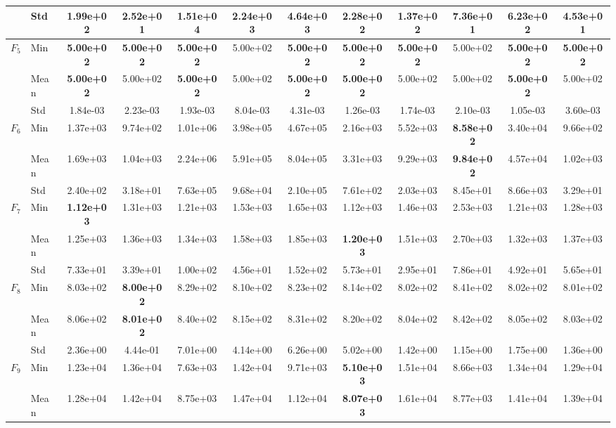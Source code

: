 \begin{center}
\begin{longtable}{clcccccccccc}
 & Std & 1.99e+02 & 2.52e+01 & 1.51e+04 & 2.24e+03 & 4.64e+03 & 2.28e+02 & 1.37e+02 & 7.36e+01 & 6.23e+02 & 4.53e+01 \\
\midrule
\multirow{3}{*}{$F_{5}$} & Min & \textbf{5.00e+02} & \textbf{5.00e+02} & \textbf{5.00e+02} & 5.00e+02 & \textbf{5.00e+02} & \textbf{5.00e+02} & \textbf{5.00e+02} & 5.00e+02 & \textbf{5.00e+02} & \textbf{5.00e+02} \\
 & Mean & \textbf{5.00e+02} & 5.00e+02 & \textbf{5.00e+02} & 5.00e+02 & \textbf{5.00e+02} & \textbf{5.00e+02} & 5.00e+02 & 5.00e+02 & \textbf{5.00e+02} & 5.00e+02 \\
 & Std & 1.84e-03 & 2.23e-03 & 1.93e-03 & 8.04e-03 & 4.31e-03 & 1.26e-03 & 1.74e-03 & 2.10e-03 & 1.05e-03 & 3.60e-03 \\
\midrule
\multirow{3}{*}{$F_{6}$} & Min & 1.37e+03 & 9.74e+02 & 1.01e+06 & 3.98e+05 & 4.67e+05 & 2.16e+03 & 5.52e+03 & \textbf{8.58e+02} & 3.40e+04 & 9.66e+02 \\
 & Mean & 1.69e+03 & 1.04e+03 & 2.24e+06 & 5.91e+05 & 8.04e+05 & 3.31e+03 & 9.29e+03 & \textbf{9.84e+02} & 4.57e+04 & 1.02e+03 \\
 & Std & 2.40e+02 & 3.18e+01 & 7.63e+05 & 9.68e+04 & 2.10e+05 & 7.61e+02 & 2.03e+03 & 8.45e+01 & 8.66e+03 & 3.29e+01 \\
\midrule
\multirow{3}{*}{$F_{7}$} & Min & \textbf{1.12e+03} & 1.31e+03 & 1.21e+03 & 1.53e+03 & 1.65e+03 & 1.12e+03 & 1.46e+03 & 2.53e+03 & 1.21e+03 & 1.28e+03 \\
 & Mean & 1.25e+03 & 1.36e+03 & 1.34e+03 & 1.58e+03 & 1.85e+03 & \textbf{1.20e+03} & 1.51e+03 & 2.70e+03 & 1.32e+03 & 1.37e+03 \\
 & Std & 7.33e+01 & 3.39e+01 & 1.00e+02 & 4.56e+01 & 1.52e+02 & 5.73e+01 & 2.95e+01 & 7.86e+01 & 4.92e+01 & 5.65e+01 \\
\midrule
\multirow{3}{*}{$F_{8}$} & Min & 8.03e+02 & \textbf{8.00e+02} & 8.29e+02 & 8.10e+02 & 8.23e+02 & 8.14e+02 & 8.02e+02 & 8.41e+02 & 8.02e+02 & 8.01e+02 \\
 & Mean & 8.06e+02 & \textbf{8.01e+02} & 8.40e+02 & 8.15e+02 & 8.31e+02 & 8.20e+02 & 8.04e+02 & 8.42e+02 & 8.05e+02 & 8.03e+02 \\
 & Std & 2.36e+00 & 4.44e-01 & 7.01e+00 & 4.14e+00 & 6.26e+00 & 5.02e+00 & 1.42e+00 & 1.15e+00 & 1.75e+00 & 1.36e+00 \\
\midrule
\multirow{3}{*}{$F_{9}$} & Min & 1.23e+04 & 1.36e+04 & 7.63e+03 & 1.42e+04 & 9.71e+03 & \textbf{5.10e+03} & 1.51e+04 & 8.66e+03 & 1.34e+04 & 1.29e+04 \\
 & Mean & 1.28e+04 & 1.42e+04 & 8.75e+03 & 1.47e+04 & 1.12e+04 & \textbf{8.07e+03} & 1.61e+04 & 8.77e+03 & 1.41e+04 & 1.39e+04 \\

\end{longtable}
\end{center}
